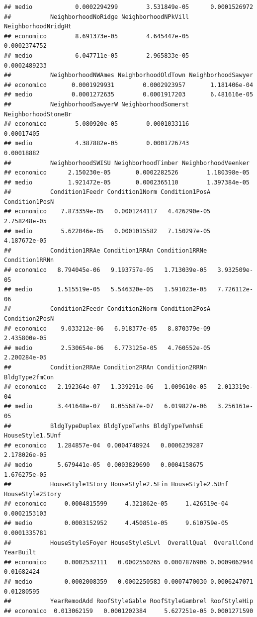 \documentclass[
]{article}
\begin{document}
\begin{verbatim}
## medio            0.0002294299        3.531849e-05      0.0001526972
##           NeighborhoodNoRidge NeighborhoodNPkVill NeighborhoodNridgHt
## economico        8.691373e-05        4.645447e-05        0.0002374752
## medio            6.047711e-05        2.965833e-05        0.0002489233
##           NeighborhoodNWAmes NeighborhoodOldTown NeighborhoodSawyer
## economico       0.0001929931        0.0002923957       1.181406e-04
## medio           0.0001272635        0.0001917203       6.481616e-05
##           NeighborhoodSawyerW NeighborhoodSomerst NeighborhoodStoneBr
## economico        5.080920e-05        0.0001033116          0.00017405
## medio            4.387882e-05        0.0001726743          0.00018882
##           NeighborhoodSWISU NeighborhoodTimber NeighborhoodVeenker
## economico      2.150230e-05       0.0002282526        1.180398e-05
## medio          1.921472e-05       0.0002365110        1.397384e-05
##           Condition1Feedr Condition1Norm Condition1PosA Condition1PosN
## economico    7.873359e-05   0.0001244117   4.426290e-05   2.758248e-05
## medio        5.622046e-05   0.0001015582   7.150297e-05   4.187672e-05
##           Condition1RRAe Condition1RRAn Condition1RRNe Condition1RRNn
## economico   8.794045e-06   9.193757e-05   1.713039e-05   3.932509e-05
## medio       1.515519e-05   5.546320e-05   1.591023e-05   7.726112e-06
##           Condition2Feedr Condition2Norm Condition2PosA Condition2PosN
## economico    9.033212e-06   6.918377e-05   8.870379e-09   2.435800e-05
## medio        2.530654e-06   6.773125e-05   4.760552e-05   2.200284e-05
##           Condition2RRAe Condition2RRAn Condition2RRNn BldgType2fmCon
## economico   2.192364e-07   1.339291e-06   1.009610e-05   2.013319e-04
## medio       3.441648e-07   8.055687e-07   6.019827e-06   3.256161e-05
##           BldgTypeDuplex BldgTypeTwnhs BldgTypeTwnhsE HouseStyle1.5Unf
## economico   1.284857e-04  0.0004748924   0.0006239287     2.178026e-05
## medio       5.679441e-05  0.0003829690   0.0004158675     1.676275e-05
##           HouseStyle1Story HouseStyle2.5Fin HouseStyle2.5Unf HouseStyle2Story
## economico     0.0004815599     4.321862e-05     1.426519e-04     0.0002153103
## medio         0.0003152952     4.450851e-05     9.610759e-05     0.0001335781
##           HouseStyleSFoyer HouseStyleSLvl  OverallQual  OverallCond  YearBuilt
## economico     0.0002532111   0.0002550265 0.0007876906 0.0009062944 0.01682424
## medio         0.0002008359   0.0002250583 0.0007470030 0.0006247071 0.01280595
##           YearRemodAdd RoofStyleGable RoofStyleGambrel RoofStyleHip
## economico  0.013062159   0.0001202384     5.627251e-05 0.0001271590

\end{verbatim}
\end{document}

